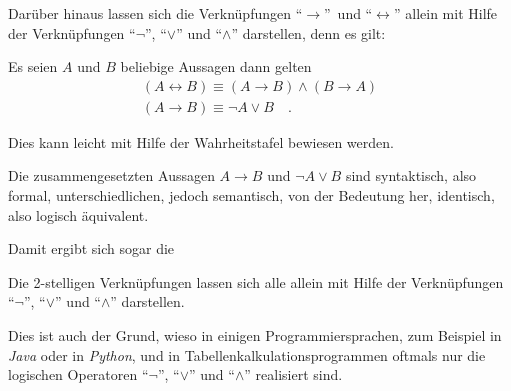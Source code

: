 \begin{Unit}[Bemerkung]
\label{bem:Aus-FolgerungVereinfachen}
Darüber hinaus lassen sich die Verknüpfungen \enquote{$\rightarrow$}\ und 
\enquote{$\leftrightarrow$} allein mit Hilfe der Verknüpfungen 
\enquote{$\neg$}, \enquote{$\lor$} und \enquote{$\land$} darstellen, denn es 
gilt: 

\begin{Bemerkung} 
Es seien $A$ und $B$ beliebige Aussagen dann gelten
\begin{align}
  (A \leftrightarrow B) \equiv (A \rightarrow B) \land 
  (B \rightarrow A) \\
  (A \rightarrow B) \equiv \neg A \lor B \quad .
\end{align}
\end{Bemerkung}

Dies kann leicht mit Hilfe der Wahrheitstafel bewiesen werden.

Die zusammengesetzten Aussagen $A \rightarrow B$ und $\neg A \lor B$ sind
syntaktisch, also formal, unterschiedlichen, jedoch semantisch, von der 
Bedeutung her, identisch, also logisch äquivalent.
\end{Unit}

\begin{Unit}[Bemerkung]
Damit ergibt sich sogar die

\begin{Bemerkung}
Die 2-stelligen Verknüpfungen lassen sich alle allein mit Hilfe der 
Verknüpfungen \enquote{$\neg$}, \enquote{$\lor$} und \enquote{$\land$} 
darstellen.
\end{Bemerkung}

Dies ist auch der Grund, wieso in einigen Programmiersprachen, zum Beispiel 
in \emph{Java} oder in \emph{Python}, und in Tabellenkalkulationsprogrammen 
oftmals nur die logischen Operatoren \enquote{$\neg$}, \enquote{$\lor$} und
\enquote{$\land$} realisiert sind.
\end{Unit}

